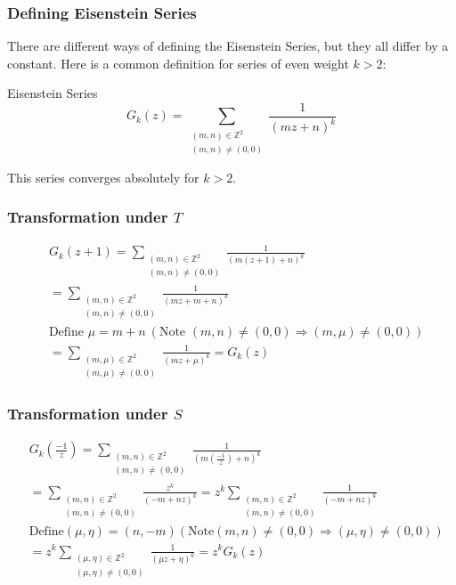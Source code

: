 \documentclass{beamer}
\begin{document}
\begin{frame}

\frametitle{Defining Eisenstein Series}
There are different ways of defining the Eisenstein Series, but they all differ by a constant. Here is a common definition for series of even weight $k>2$: 
\begin{block}{Eisenstein Series}
$$G_k(z) = \sum_{\substack{(m,n) \in \mathbb{Z}^2 \\ (m,n) \neq (0,0)}}  \frac{1}{(m z + n)^k}$$
\end{block}
This series converges absolutely for $k>2$.

\end{frame}

\begin{frame}
\frametitle{Transformation under $T$}

\begin{align*}
& G_k(z+ 1) = \sum_{\substack{(m,n) \in \mathbb{Z}^2 \\ (m,n) \neq (0,0)}}  \frac{1}{(m (z+1) + n)^k} \\
& = \sum_{\substack{(m,n) \in \mathbb{Z}^2 \\ (m,n) \neq (0,0)}}  \frac{1}{(m z+ m +  n)^k} \\
& \text{Define } \mu=m+n \ (\text{Note } (m,n) \neq (0,0) \Rightarrow (m, \mu) \neq (0,0)) \\
& =  \sum_{\substack{(m,\mu) \in \mathbb{Z}^2 \\ (m,\mu) \neq (0,0)}}  \frac{1}{(m z+ \mu)^k} = G_k(z)
\end{align*}


\end{frame}

\begin{frame}
\frametitle{Transformation under $S$}

\begin{align*}
&G_k \left( \frac{-1}{z} \right) = \sum_{\substack{(m,n) \in \mathbb{Z}^2 \\ (m,n) \neq (0,0)}}  \frac{1}{(m (\frac{-1}{z}) + n)^k} \\
&= \sum_{\substack{(m,n) \in \mathbb{Z}^2 \\ (m,n) \neq (0,0)}}  \frac{z^k}{(-m + n z)^k} = z^k \sum_{\substack{(m,n) \in \mathbb{Z}^2 \\ (m,n) \neq (0,0)}}  \frac{1}{(-m + n z)^k} \\
& \text{Define} (\mu, \eta) = (n, -m) (\text{Note} (m,n) \neq (0,0) \Rightarrow (\mu, \eta) \neq (0,0)) \\
& = z^k \sum_{\substack{(\mu, \eta) \in \mathbb{Z}^2 \\ (\mu, \eta) \neq (0,0)}}  \frac{1}{(\mu z + \eta)^k} = z^k G_k(z)
\end{align*}

\end{frame}
\end{document}
